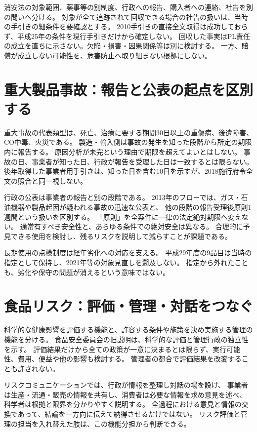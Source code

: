 消安法の対象範囲、薬事等の別制度、行政への報告、購入者への連絡、社告を別の問いへ分ける。
対象が全て追跡されて回収できる場合の社告の扱いは、当時の手引きの細条件を要確認とする。
2010手引きの直接全文取得は成功しておらず、平成25年の条件を現行手引きだけから確定しない。\cite{saf53_recall2010}
回収した事実はPL責任の成立を直ちに示さない。欠陥・損害・因果関係等は別に検討する。
一方、賠償が成立しない可能性を、危害防止へ取り組まない根拠にしない。\cite{pl_statute,pl_qa}

\section{重大製品事故：報告と公表の起点を区別する}
\label{theory:safety:productaccident}
重大事故の代表類型は、死亡、治療に要する期間30日以上の重傷病、後遺障害、CO中毒、火災である。
製造・輸入側は事故の発生を知った段階から所定の期限内に報告する。
原因分析が未完という理由で期限を超えてよいとはしない。\cite{saf53_products2012}
事故の日、事業者が知った日、行政が報告を受理した日は一致するとは限らない。
後年取得した事業者用手引きは、知った日を含む10日を示すが、2018施行府令全文の照合と同一視しない。\cite{saf53_products2023}

行政の公表は事業者の報告と別の段階である。
2013年のフローでは、ガス・石油機器や製品起因が疑われる事故の迅速な公表と、
他の段階の報告受理後原則1週間という扱いを区別する。
「原則」を全案件に一律の法定絶対期限へ変えない。\cite{saf53_productflow2013}
通常有すべき安全性と、あらゆる条件での絶対安全は異なる。
合理的に予見できる使用を検討し、残るリスクを説明して減らすことが課題である。

長期使用の点検制度は経年劣化への対応を支える。
平成29年度の9品目は当時の指定として保持し、2021年等の対象見直しを遡及しない。
指定から外れたことも、劣化や保守の問題が消えるという意味ではない。\cite{saf53_oldnine}

\section{食品リスク：評価・管理・対話をつなぐ}
\label{theory:safety:foodroles}
科学的な健康影響を評価する機能と、許容する条件や施策を決め実施する管理の機能を分ける。
食品安全委員会の旧説明は、科学的な評価と管理行政の独立性を示す。\cite{saf53_food_roles2007}
評価結果だけから全ての政策が一意に決まるとは限らず、実行可能性、費用、便益や他の影響も検討する。
管理者の都合で評価結果を改変することも許されない。

リスクコミュニケーションでは、行政が情報を整理し対話の場を設け、
事業者は生産・流通・販売の情報を共有し、消費者は必要な情報を求め意見を述べ、
科学者は根拠と限界を分かりやすく説明する。
全過程における意見と情報の交換であって、結論を一方向に伝えて納得させるだけではない。\cite{saf_fsc_psych,saf_fsc_glossary}
リスク評価と管理の担当を入れ替えた肢は、この機能分担から判断できる。


